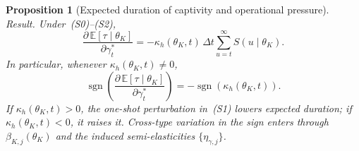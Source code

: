 \documentclass[12pt]{article}
\numberwithin{equation}{section}
\numberwithin{table}{section}
\newtheorem{proposition}[theorem]{Proposition}
\theoremstyle{definition}
\begin{document}
\begin{proposition}[Expected duration of captivity and operational pressure]
\medskip
\noindent\textit{Result.}
Under~\textup{(S0)--(S2)},
\begin{equation}
\label{eq:dE-dgamma-prop}
\frac{\partial\,\mathbb{E}[\tau\mid\theta_K]}{\partial\gamma_t^\ast}
=-\kappa_h(\theta_K,t)\,\Delta t\sum_{u=t}^{\infty}S(u\mid\theta_K).
\end{equation}
In particular, whenever $\kappa_h(\theta_K,t)\neq 0$,
\begin{equation}
\operatorname{sgn}\!\left(
  \frac{\partial\,\mathbb{E}[\tau\mid\theta_K]}{\partial\gamma_t^\ast}
\right)
=-\operatorname{sgn}\!\left(\kappa_h(\theta_K,t)\right).
\end{equation}
If $\kappa_h(\theta_K,t)>0$, the one-shot perturbation in~\textup{(S1)} lowers
expected duration; if $\kappa_h(\theta_K,t)<0$, it raises it. Cross-type
variation in the sign enters through $\beta_{K,j}(\theta_K)$ and the induced
semi-elasticities $\{\eta_{\gamma,j}\}$.
\end{proposition}
\end{document}
